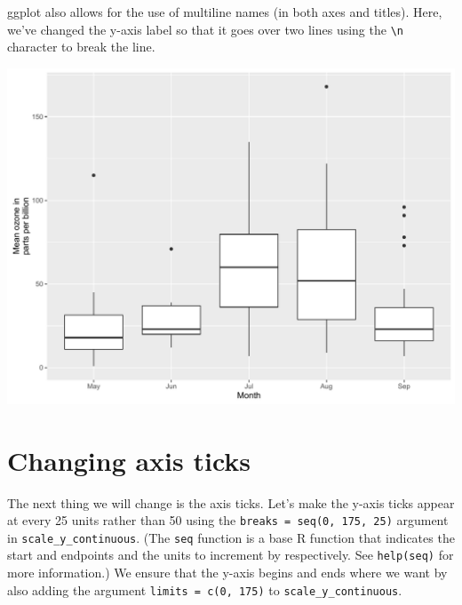 ggplot also allows for the use of multiline names (in both axes and
titles). Here, we've changed the y-axis label so that it goes over two
lines using the \texttt{\textbackslash{}n} character to break the line.

\begin{Shaded}
\begin{Highlighting}[]
\StringTok{ }\StringTok{ }\NormalTok{(} \NormalTok{)}
\end{Highlighting}
\end{Shaded}

\begin{center}\includegraphics[width=0.55\linewidth]{figures/box_3-1} \end{center}

\section{Changing axis ticks}\label{changing-axis-ticks-3}

The next thing we will change is the axis ticks. Let's make the y-axis
ticks appear at every 25 units rather than 50 using the
\texttt{breaks\ =\ seq(0,\ 175,\ 25)} argument in
\texttt{scale\_y\_continuous}. (The \texttt{seq} function is a base R
function that indicates the start and endpoints and the units to
increment by respectively. See \texttt{help(seq)} for more information.)
We ensure that the y-axis begins and ends where we want by also adding
the argument \texttt{limits\ =\ c(0,\ 175)} to
\texttt{scale\_y\_continuous}.

\begin{Shaded}
\begin{Highlighting}[]
\StringTok{ }\StringTok{ }\NormalTok{(} \NormalTok{,}
\StringTok{           } \NormalTok{(}\NormalTok{, }\NormalTok{, }\NormalTok{),}
\StringTok{           }\NormalTok{(}\NormalTok{, }\NormalTok{))}
\end{Highlighting}
\end{Shaded}

